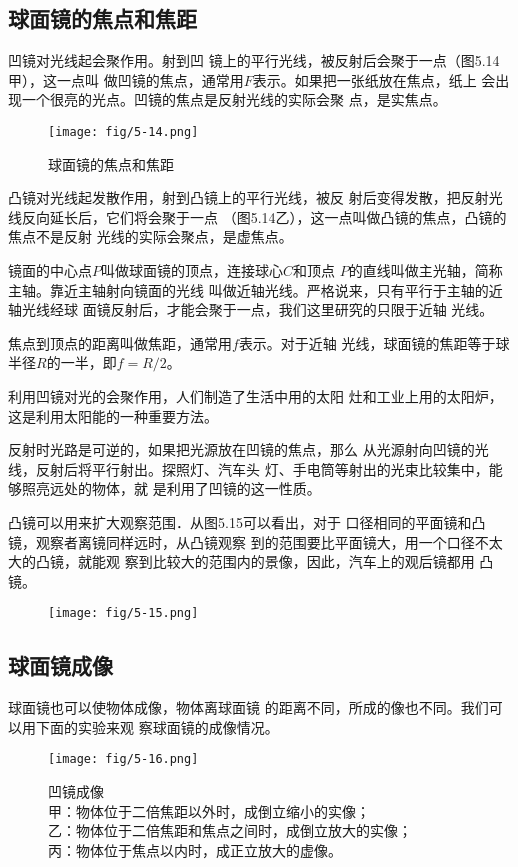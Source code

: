\subsection{球面镜的焦点和焦距}

凹镜对光线起会聚作用。射到凹
镜上的平行光线，被反射后会聚于一点（图5.14甲），这一点叫
做凹镜的焦点，通常用$F$表示。如果把一张纸放在焦点，纸上
会出现一个很亮的光点。凹镜的焦点是反射光线的实际会聚
点，是实焦点。
\begin{figure}[htp]\centering
    \texttt{[image: fig/5-14.png]}
    \caption{球面镜的焦点和焦距}
    \end{figure}

凸镜对光线起发散作用，射到凸镜上的平行光线，被反
射后变得发散，把反射光线反向延长后，它们将会聚于一点
（图5.14乙），这一点叫做凸镜的焦点，凸镜的焦点不是反射
光线的实际会聚点，是虚焦点。

镜面的中心点$P$叫做球面镜的顶点，连接球心$C$和顶点
$P$的直线叫做主光轴，简称主轴。靠近主轴射向镜面的光线
叫做近轴光线。严格说来，只有平行于主轴的近轴光线经球
面镜反射后，才能会聚于一点，我们这里研究的只限于近轴
光线。

焦点到顶点的距离叫做焦距，通常用$f$表示。对于近轴
光线，球面镜的焦距等于球半径$R$的一半，即$f=R/2$。

利用凹镜对光的会聚作用，人们制造了生活中用的太阳
灶和工业上用的太阳炉，这是利用太阳能的一种重要方法。

反射时光路是可逆的，如果把光源放在凹镜的焦点，那么
从光源射向凹镜的光线，反射后将平行射出。探照灯、汽车头
灯、手电筒等射出的光束比较集中，能够照亮远处的物体，就
是利用了凹镜的这一性质。

凸镜可以用来扩大观察范围．从图5.15可以看出，对于
口径相同的平面镜和凸镜，观察者离镜同样远时，从凸镜观察
到的范围要比平面镜大，用一个口径不太大的凸镜，就能观
察到比较大的范围内的景像，因此，汽车上的观后镜都用
凸镜。

\begin{figure}[htp]\centering
    \texttt{[image: fig/5-15.png]}
    \caption{}
    \end{figure}

\subsection{球面镜成像}
球面镜也可以使物体成像，物体离球面镜
的距离不同，所成的像也不同。我们可以用下面的实验来观
察球面镜的成像情况。
\begin{figure}[htp]\centering
    \texttt{[image: fig/5-16.png]}
    \caption{凹镜成像\\
    甲：物体位于二倍焦距以外时，成倒立缩小的实像；\\
    乙：物体位于二倍焦距和焦点之间时，成倒立放大的实像；\\
    丙：物体位于焦点以内时，成正立放大的虚像。}
    \end{figure}


